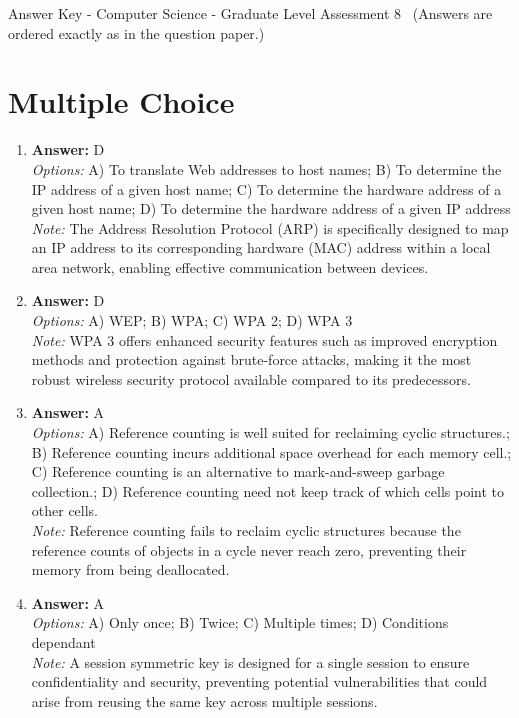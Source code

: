 \documentclass[12pt]{article}
\begin{document}
\begin{center}
Answer Key - Computer Science - Graduate Level Assessment 8 \
\small (Answers are ordered exactly as in the question paper.)
\end{center}

\section*{Multiple Choice}
\begin{enumerate}[label=\arabic*.]
\item \textbf{Answer:} D
\\ \textit{Options:} A) To translate Web addresses to host names; B) To determine the IP address of a given host name; C) To determine the hardware address of a given host name; D) To determine the hardware address of a given IP address
\\ \textit{Note:} The Address Resolution Protocol (ARP) is specifically designed to map an IP address to its corresponding hardware (MAC) address within a local area network, enabling effective communication between devices.
\item \textbf{Answer:} D
\\ \textit{Options:} A) WEP; B) WPA; C) WPA 2; D) WPA 3
\\ \textit{Note:} WPA 3 offers enhanced security features such as improved encryption methods and protection against brute-force attacks, making it the most robust wireless security protocol available compared to its predecessors.
\item \textbf{Answer:} A
\\ \textit{Options:} A) Reference counting is well suited for reclaiming cyclic structures.; B) Reference counting incurs additional space overhead for each memory cell.; C) Reference counting is an alternative to mark-and-sweep garbage collection.; D) Reference counting need not keep track of which cells point to other cells.
\\ \textit{Note:} Reference counting fails to reclaim cyclic structures because the reference counts of objects in a cycle never reach zero, preventing their memory from being deallocated.
\item \textbf{Answer:} A
\\ \textit{Options:} A) Only once; B) Twice; C) Multiple times; D) Conditions dependant
\\ \textit{Note:} A session symmetric key is designed for a single session to ensure confidentiality and security, preventing potential vulnerabilities that could arise from reusing the same key across multiple sessions.

\end{enumerate}
\end{document}
